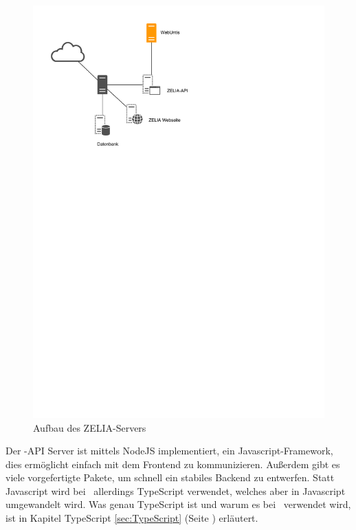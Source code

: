 \begin{figure}[H]
    \centering
    \includegraphics[width=120mm]{./media/Intro/server_arch.svg.pdf}
    \caption{Aufbau des ZELIA-Servers}
    \label{fig:server_arch}
\end{figure}

Der \ZELIA-API Server ist mittels NodeJS implementiert, ein Javascript-Framework, dies ermöglicht einfach mit dem Frontend zu kommunizieren. Außerdem gibt es viele vorgefertigte Pakete, um schnell ein stabiles Backend zu entwerfen. Statt Javascript wird bei \ZELIA\ allerdings TypeScript verwendet, welches aber in Javascript umgewandelt wird. Was genau TypeScript ist und warum es bei \ZELIA\ verwendet wird, ist in Kapitel TypeScript \ref{sec:TypeScript} (Seite \pageref{sec:TypeScript}) erläutert.


